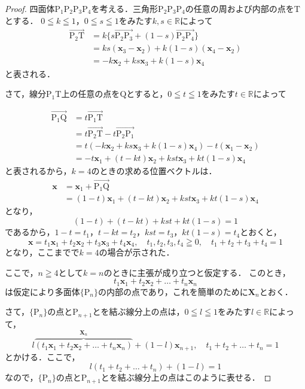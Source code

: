 \documentclass[uplatex,dvipdfmx,a4paper,11pt,fleqn]{jsarticle}
\begin{document}
\begin{leftbar}
    \begin{proof}
    四面体$\mathrm{P_1 P_2 P_3 P_4}$を考える．三角形$\mathrm{P_2 P_3 P_4}$の任意の周および内部の点を$\mathrm{T}$とする．
    $0 \leqq k \leqq 1$，$0 \leqq s \leqq 1$をみたす$k,s \in \mathbb{R}$によって
    \begin{align*}
        \overrightarrow{\mathrm{P_2 T}} & = k \{ s \overrightarrow{\mathrm{P_2 P_3}} + (1-s) \overrightarrow{\mathrm{P_2 P_4}} \} \\
        & = ks(\bm{x}_3 -\bm{x}_2) + k(1-s) (\bm{x}_4-\bm{x}_2) \\
        & = -k\bm{x}_2 + ks \bm{x}_3 + k(1-s) \bm{x}_4
    \end{align*}
    と表される．

    さて，線分$\mathrm{P_1 T}$上の任意の点を$\mathrm{Q}$とすると，$0 \leqq t \leqq 1$をみたす$t \in \mathbb{R}$によって

    \begin{align*} 
        \overrightarrow{\mathrm{P_1 Q}} & =t \overrightarrow{\mathrm{P_1 T}}\\
        & = t\overrightarrow{\mathrm{P_2 T}} - t\overrightarrow{\mathrm{P_2 P_1}}　\\
        & = t (-k\bm{x}_2 + ks \bm{x}_3 + k(1-s) \bm{x}_4)-t(\bm{x}_1 -\bm{x}_2) \\
        & = -t\bm{x}_1 +(t-kt) \bm{x}_2 + kst \bm{x}_3 +kt(1-s) \bm{x}_4 
    \end{align*} 
    と表されるから，$k=4$のときの求める位置ベクトルは．
    \begin{align*}
        \bm{x} & = \bm{x}_1 + \overrightarrow{\mathrm{P_1 Q}} \\
        & = (1-t) \bm{x}_1 +(t-kt)\bm{x}_2 +kst \bm{x}_3 +kt(1-s) \bm{x}_4 
    \end{align*} 
    となり，
    \[
        (1-t)+ (t-kt)+kst + kt(1-s)=1
    \]
    であるから，$1-t = t_1$，$t-kt =t_2$，$kst = t_3$，$kt(1-s)=t_4$とおくと，
    \[
        \bm{x}= t_1 \bm{x}_1 + t_2 \bm{x}_2 + t_3 \bm{x}_3 + t_4 \bm{x}_4 , \quad t_1, t_2 ,t_3 , t_4 \geqq 0 ,\quad  t_1 +t_2 + t_3 + t_4 =1
    \]
    となり，ここまでで$k=4$の場合が示された．

    ここで，$n \geqq 4$として$k=n$のときに主張が成り立つと仮定する．
    このとき，
    \[
        t_1 \bm{x}_1 + t_2 \bm{x}_2+\dots+ t_n \bm{x}_n
    \]
    は仮定により多面体$\{ \mathrm{P}_n \}$の内部の点であり，これを簡単のために$\bm{X}_n$とおく．

    さて，$\{ \mathrm{P}_n \}$の点と$\mathrm{P}_{n+1}$とを結ぶ線分上の点は，$ 0 \leqq l \leqq 1$をみたす$l \in \mathbb{R}$によって，
    \[
        l \overbrace{(  t_1 \bm{x}_1 + t_2 \bm{x}_2+\dots+ t_n \bm{x}_n)}^{\bm{X}_n}+(1-l) \bm{x}_{n+1} , \quad t_1+t_2+\dots + t_n =1 
    \]
    とかける．ここで，
    \[
        l(t_1+t_2+\dots+t_n)+(1-l)=1
    \]
    なので，$\{ \mathrm{P}_n \}$の点と$\mathrm{P}_{n+1}$とを結ぶ線分上の点はこのように表せる．


\end{proof}
\end{leftbar}
\end{document}
